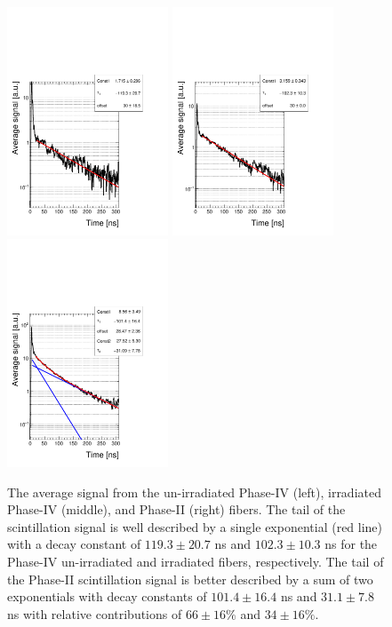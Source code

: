 \documentclass[a4paper,11pt]{article}
\begin{document}
\begin{figure}[ht]
\begin{center}
      \includegraphics[width=4.8cm]{Figures/B5_R11864_fit_zoom_singleLog.pdf}
      \includegraphics[width=4.8cm]{Figures/B4_R11863_fit_zoom_singleLog.pdf}
      \includegraphics[width=4.8cm]{Figures/B1_R11862_fit_zoom_singleLog.pdf}
\caption{\small The average signal from the un-irradiated Phase-IV (left), irradiated Phase-IV (middle), and Phase-II (right) fibers. The tail of the scintillation signal is well described by a single exponential (red line) with a decay constant of $119.3 \pm 20.7$ ns and $102.3 \pm 10.3$ ns for the Phase-IV un-irradiated and irradiated fibers, respectively. The tail of the Phase-II scintillation signal is better described by a sum of two exponentials with decay constants of $101.4 \pm 16.4$ ns and $31.1  \pm 7.8$ ns with relative contributions of $66 \pm 16 \%$ and $34 \pm 16 \%$.}
    \label{fig:phase4scintTime}
\end{center}
\end{figure}
\end{document}

